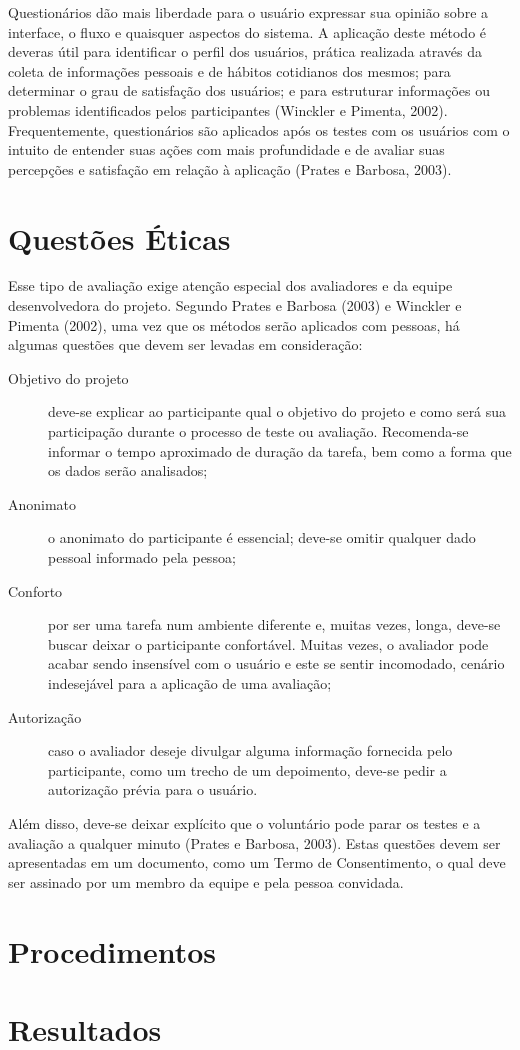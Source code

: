 Questionários dão mais liberdade para o usuário expressar sua opinião sobre a interface, o fluxo e quaisquer aspectos do sistema. A aplicação deste método é deveras útil para identificar o perfil dos usuários, prática realizada através da coleta de informações pessoais e de hábitos cotidianos dos mesmos; para determinar o grau de satisfação dos usuários; e para estruturar informações ou problemas identificados pelos participantes (Winckler e Pimenta, 2002). Frequentemente, questionários são aplicados após os testes com os usuários com o intuito de entender suas ações com mais profundidade e de avaliar suas percepções e satisfação em relação à aplicação (Prates e Barbosa, 2003).

\section{Questões Éticas}

Esse tipo de avaliação exige atenção especial dos avaliadores e da equipe desenvolvedora do projeto. Segundo Prates e Barbosa (2003) e Winckler e Pimenta (2002), uma vez que os métodos serão aplicados com pessoas, há algumas questões que devem ser levadas em consideração:
    \begin{description}
        \item [Objetivo do projeto] deve-se explicar ao participante qual o objetivo do projeto e como será sua participação durante o processo de teste ou avaliação. Recomenda-se informar o tempo aproximado de duração da tarefa, bem como a forma que os dados serão analisados;
        \item [Anonimato] o anonimato do participante é essencial; deve-se omitir qualquer dado pessoal informado pela pessoa;
        \item [Conforto] por ser uma tarefa num ambiente diferente e, muitas vezes, longa, deve-se buscar deixar o participante confortável. Muitas vezes, o avaliador pode acabar sendo insensível com o usuário e este se sentir incomodado, cenário indesejável para a aplicação de uma avaliação;
        \item [Autorização] caso o avaliador deseje divulgar alguma informação fornecida pelo participante, como um trecho de um depoimento, deve-se pedir a autorização prévia para o usuário.
    \end{description}
Além disso, deve-se deixar explícito que o voluntário pode parar os testes e a avaliação a qualquer minuto (Prates e Barbosa, 2003). Estas questões devem ser apresentadas em um documento, como um Termo de Consentimento, o qual deve ser assinado por um membro da equipe e pela pessoa convidada.

\section{Procedimentos}
\section{Resultados}